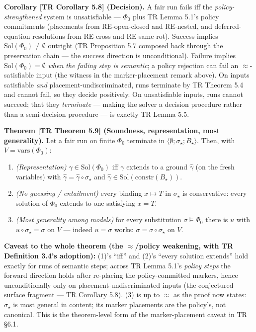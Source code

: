 \documentclass[
  10pt,
  letterpaper,
]{article}
\providecommand{\tightlist}{%
  \setlength{\itemsep}{0pt}\setlength{\parskip}{0pt}}
\begin{document}
\textbf{Corollary {[}TR Corollary 5.8{]} (Decision).} A fair run fails
iff the \emph{policy-strengthened} system is unsatisfiable ---
\(\Phi_0\) plus TR Lemma 5.1's policy commitments (placements from
RE-open-closed and RE-nested, and deferred-equation resolutions from
RE-cross and RE-same-rot). Success implies
\(\mathrm{Sol}(\Phi_0) \ne \emptyset\) outright (TR Proposition 5.7
composed back through the preservation chain --- the success direction
is unconditional). Failure implies \(\mathrm{Sol}(\Phi_0) = \emptyset\)
\emph{when the failing step is semantic}; a policy rejection can fail an
\(\approx\)-satisfiable input (the witness in the marker-placement
remark above). On inputs satisfiable \emph{and}
placement-undiscriminated, runs terminate by TR Theorem 5.4 and cannot
fail, so they decide positively. On unsatisfiable inputs, runs cannot
succeed; that they \emph{terminate} --- making the solver a decision
procedure rather than a semi-decision procedure --- is exactly TR Lemma
5.5.

\textbf{Theorem {[}TR Theorem 5.9{]} (Soundness, representation, most
generality).} Let a fair run on finite \(\Phi_0\) terminate in
\(\langle\emptyset; \sigma_\star; B_\star\rangle\). Then, with
\(V = \mathrm{vars}(\Phi_0)\):

\begin{enumerate}
\def\labelenumi{\arabic{enumi}.}
\tightlist
\item
  \emph{(Representation)} \(\gamma \in \mathrm{Sol}(\Phi_0)\) iff
  \(\gamma\) extends to a ground \(\hat\gamma\) (on the fresh variables)
  with \(\hat\gamma = \hat\gamma \circ \sigma_\star\) and
  \(\hat\gamma \in \mathrm{Sol}(\mathrm{constr}(B_\star))\).
\item
  \emph{(No guessing / entailment)} every binding \(x \mapsto T\) in
  \(\sigma_\star\) is conservative: every solution of \(\Phi_0\) extends
  to one satisfying \(x = T\).
\item
  \emph{(Most generality among models)} for every substitution
  \(\sigma \models \Phi_0\) there is \(u\) with
  \(u \circ \sigma_\star = \sigma\) on \(V\) --- indeed \(u = \sigma\)
  works: \(\sigma = \sigma \circ \sigma_\star\) on \(V\).
\end{enumerate}

\textbf{Caveat to the whole theorem (the \(\approx\)/policy weakening,
with TR Definition 3.4's adoption):} (1)'s ``iff'' and (2)'s ``every
solution extends'' hold exactly for runs of semantic steps; across TR
Lemma 5.1's \emph{policy steps} the forward direction holds after
re-placing the policy-committed markers, hence unconditionally only on
placement-undiscriminated inputs (the conjectured surface fragment ---
TR Corollary 5.8). (3) is up to \(\approx\) as the proof now states:
\(\sigma_\star\) is most general in content; its marker placements are
the policy's, not canonical. This is the theorem-level form of the
marker-placement caveat in TR §6.1.
\end{document}
